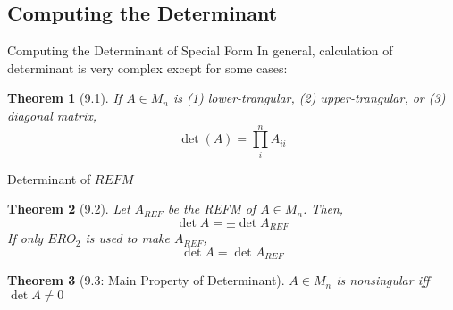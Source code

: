 \documentclass[final]{beamer}
\newtheorem{thm}{Theorem}
\begin{document}
\subsection{Computing the Determinant} %
\label{sub:computing_the_determinant}
\begin{frame}[t]{Computing the Determinant of Special Form}
	In general, calculation of determinant is very complex except for some cases:
	\begin{thm}
		[9.1] If $A\in M_n$ is (1) lower-trangular, (2) upper-trangular, or (3) diagonal matrix, \[
			\det (A) = \prod_i^n A_{ii}
		\]
	\end{thm}
\end{frame}
\begin{frame}[t]{Determinant of $REFM$}
	\begin{thm}
		[9.2] Let $A_{REF}$ be the REFM of $A\in M_n$. Then, 
		\[
			\det A = \pm \det A_{REF}
		\] If only $ERO_2$ is used to make $A_{REF}$, 
		\[
			\det A  = \det A_{REF}
		\]
	\end{thm}
	\begin{thm}
		[9.3: Main Property of Determinant] $A\in M_n$ is nonsingular iff $\det A \neq 0$
	\end{thm}
\end{frame}
\end{document}
